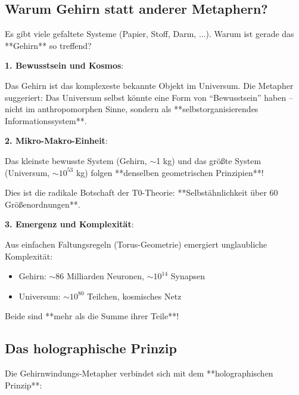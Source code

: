 	\subsection{Warum Gehirn statt anderer Metaphern?}
	
	Es gibt viele gefaltete Systeme (Papier, Stoff, Darm, ...). Warum ist gerade das **Gehirn** so treffend?
	
	\begin{philosophical}
		\textbf{1. Bewusstsein und Kosmos}:
		
		Das Gehirn ist das komplexeste bekannte Objekt im Universum. Die Metapher suggeriert: Das Universum selbst könnte eine Form von \enquote{Bewusstsein} haben -- nicht im anthropomorphen Sinne, sondern als **selbstorganisierendes Informationssystem**.
		
		\vspace{0.3cm}
		
		\textbf{2. Mikro-Makro-Einheit}:
		
		Das kleinste bewusste System (Gehirn, $\sim$1 kg) und das größte System (Universum, $\sim 10^{53}$ kg) folgen **denselben geometrischen Prinzipien**!
		
		Dies ist die radikale Botschaft der T0-Theorie: **Selbstähnlichkeit über 60 Größenordnungen**.
		
		\vspace{0.3cm}
		
		\textbf{3. Emergenz und Komplexität}:
		
		Aus einfachen Faltungsregeln (Torus-Geometrie) emergiert unglaubliche Komplexität:
		\begin{itemize}
			\item Gehirn: $\sim 86$ Milliarden Neuronen, $\sim 10^{14}$ Synapsen
			\item Universum: $\sim 10^{80}$ Teilchen, kosmisches Netz
		\end{itemize}
		
		Beide sind **mehr als die Summe ihrer Teile**!
	\end{philosophical}
	
	\subsection{Das holographische Prinzip}
	
	Die Gehirnwindungs-Metapher verbindet sich mit dem **holographischen Prinzip**:
	
